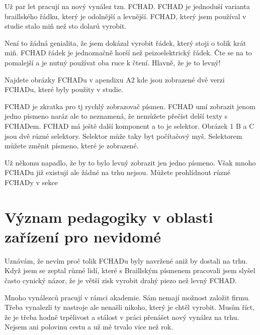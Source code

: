 Už par let pracují na nový vynález tzn. FCHAD. FCHAD je jednoduší varianta braillského řádku, který je odolnější a levnější.  FCHAD, který jsem používal v studie stalo miň než sto dolarů vyrobit.

Není to žádná genialita, že jsem dokázal vyrobit řádek, který stoji o tolik krát miň.  FCHAD řádek je jednoznačně horší než peizoelektrický řádek.  Čte se na to pomalejší a je nutný používat oba ruce k čtení.  Hlavně, že je to levný!

Najdete obrázky FCHADu v apendixu A2 kde jsou zobrazené dvě verzi FCHADu, které byly použity v studie.

FCHAD je zkratka pro  tj rychlý zobrazovač písmen.  FCHAD umí zobrazit jenom jedno písmeno naráz ale to neznamená, že nemůžete přečíst delší texty s FCHADem.  FCHAD má ještě další komponent a to je selektor.  Obrázek 1 B a C jsou dvě různé selektory.  Selektor může taky byt počítačový myš.  Selektorem můžete změnit písmeno, které je zobrazené.

Už někomu napadlo, že by to bylo levný zobrazit jen jedno písmeno. Však mnoho FCHADu již existují ale žádné na trhu nejsou.  Můžete prohlídnout různé FCHADy v sekce 

\section{Význam pedagogiky v oblasti zařízení pro nevidomé}

Uznávám, že nevím proč tolik FCHADu byly navržené aniž by dostali na trhu.  Když jsem se zeptal různé lidí, které s Braillským písmenem pracovali jsem slyšel často cynický názor, že je větší zisk vyrobit drahý piezo než levný FCHAD.

Mnoho vynálezců pracují v rámci akademie. Sám nemají možnost založit firmu. Třeba vynalezli ty nastroje ale nenašli nikoho, který je chtěl vyrobit. Musím říct, že je třeba hodně trpělivost a stálost v práci přenášet nový vynález na trhu.  Nejsem ani polovinu cestu a už mě trvalo vice než rok.

